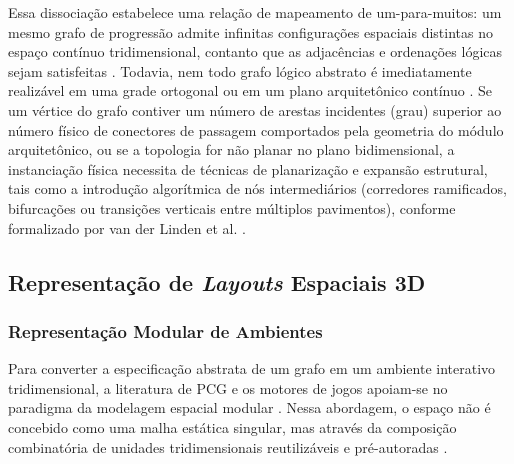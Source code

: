 Essa dissociação estabelece uma relação de mapeamento de um-para-muitos: um mesmo grafo de progressão admite infinitas configurações espaciais distintas no espaço contínuo tridimensional, contanto que as adjacências e ordenações lógicas sejam satisfeitas \cite{dormans2010, linden2013designing}. Todavia, nem todo grafo lógico abstrato é imediatamente realizável em uma grade ortogonal ou em um plano arquitetônico contínuo \cite{linden2013designing, linden2014dungeons}. Se um vértice do grafo contiver um número de arestas incidentes (grau) superior ao número físico de conectores de passagem comportados pela geometria do módulo arquitetônico, ou se a topologia for não planar no plano bidimensional, a instanciação física necessita de técnicas de planarização e expansão estrutural, tais como a introdução algorítmica de nós intermediários (corredores ramificados, bifurcações ou transições verticais entre múltiplos pavimentos), conforme formalizado por van der Linden et al. \cite*{linden2013designing, linden2014dungeons}.

\subsection{Representação de \textit{Layouts} Espaciais 3D}
\label{sec:layout_3d}

\subsubsection{Representação Modular de Ambientes}
\label{sec:representacao_modular}

Para converter a especificação abstrata de um grafo em um ambiente interativo tridimensional, a literatura de PCG e os motores de jogos apoiam-se no paradigma da modelagem espacial modular \cite{linden2014dungeons, shaker2016constructive, xu2025databasedrivenframework3dlevel}. Nessa abordagem, o espaço não é concebido como uma malha estática singular, mas através da composição combinatória de unidades tridimensionais reutilizáveis e pré-autoradas \cite{linden2014dungeons, shaker2016constructive, xu2025databasedrivenframework3dlevel}.

